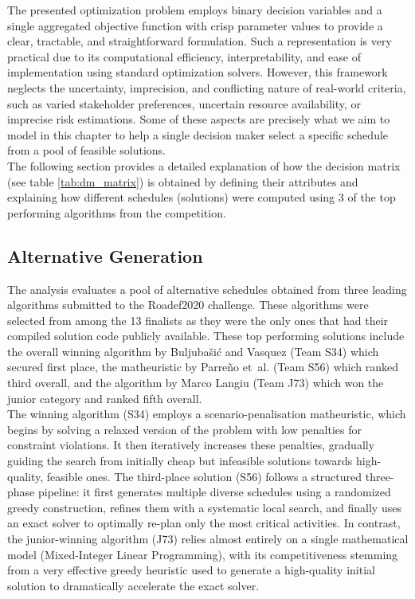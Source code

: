 The presented optimization problem employs binary decision variables and a single aggregated objective function with crisp parameter values to provide a clear, tractable, and straightforward formulation. Such a representation is very practical due to its computational efficiency, interpretability, and ease of implementation using standard optimization solvers. However, this framework neglects the uncertainty, imprecision, and conflicting nature of  real-world criteria, such as varied stakeholder preferences, uncertain resource availability, or imprecise risk estimations. Some of these aspects are precisely what we aim to model in this chapter to help a single decision maker select a specific schedule from a pool of feasible solutions. \\

The following section provides a detailed explanation of how the decision matrix (see table \ref{tab:dm_matrix}) is obtained by defining their attributes and explaining how different schedules (solutions) were computed using 3 of the top performing algorithms from the competition.

\subsection{Alternative Generation}

The analysis evaluates a pool of alternative schedules obtained from three leading algorithms submitted to the Roadef2020 challenge. These algorithms were selected from among the 13 finalists as they were the only ones that had their compiled solution code publicly available. These top performing solutions include the overall winning algorithm by Buljubašić and Vasquez\cite{top1} (Team S34) which secured first place, the matheuristic by Parreño et~al.\cite{ConsueloRoadef} (Team S56) which ranked third overall, and the algorithm by Marco Langiu\cite{top5} (Team J73) which won the junior category and ranked fifth overall.\\



The winning algorithm (S34) employs a scenario-penalisation matheuristic, which begins by solving a relaxed version of the problem with low penalties for constraint violations. It then iteratively increases these penalties, gradually guiding the search from initially cheap but infeasible solutions towards high-quality, feasible ones. The third-place solution (S56) follows a structured three-phase pipeline: it first generates multiple diverse schedules using a randomized greedy construction, refines them with a systematic local search, and finally uses an exact solver to optimally re-plan only the most critical activities. In contrast, the junior-winning algorithm (J73) relies almost entirely on a single mathematical model (Mixed-Integer Linear Programming), with its competitiveness stemming from a very effective greedy heuristic used to generate a high-quality initial solution to dramatically accelerate the exact solver.\\

